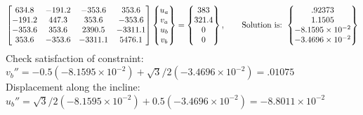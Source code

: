 \begin{example}
{\begin{enumerate}[label=(\arabic*),leftmargin=*]
\begin{gather*}
      \begin{bmatrix}634.8 & -191.2 & -353.6 & 353.6\\ -191.2 & 447.3 & 353.6 & -353.6\\ -353.6 & 353.6 & 2390.5 & -3311.1\\ 353.6 & -353.6 & -3311.1 & 5476.1\end{bmatrix}\begin{Bmatrix}u_a\\ v_a\\ u_b\\ v_b\end{Bmatrix} = \begin{Bmatrix}383\\ 321.4\\ 0\\ 0\end{Bmatrix},\qquad
      \text{Solution is: }\begin{Bmatrix}.92373\\ 1.1505\\ -8.1595\times10^{-2}\\ -3.4696\times10^{-2}\end{Bmatrix}
    \end{gather*}
    Check satisfaction of constraint: $v_b'' = -0.5(-8.1595\times10^{-2}) + \sqrt3/2(-3.4696\times10^{-2}) = .01075$\\
    Displacement along the incline: $u_b'' = \sqrt3/2(-8.1595\times10^{-2}) + 0.5(-3.4696\times10^{-2}) = -8.8011\times10^{-2}$
\end{enumerate}

}

\end{example}
